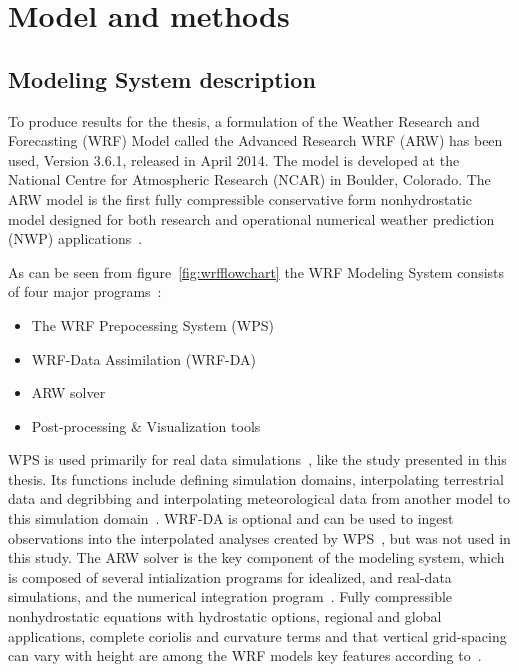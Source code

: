 \chapter{Model and methods}
\label{chap:modmet}
\section{Modeling System description}
\label{sec:modeldes}

To produce results for the thesis, a formulation of the Weather Research and Forecasting (WRF) Model called the Advanced Research WRF (ARW) has been used, Version 3.6.1, released in April 2014. The model is developed at the National Centre for Atmospheric Research (NCAR) in Boulder, Colorado. The ARW model is the first fully compressible conservative form nonhydrostatic model designed for both research and operational numerical weather prediction (NWP) applications~\citep{Skamarock2008}. 

As can be seen from figure~\ref{fig:wrfflowchart} the WRF Modeling System consists of four major programs~\citep{Wang2015}:
\begin{itemize}
\item The WRF Prepocessing System (WPS)
\item WRF-Data Assimilation (WRF-DA)
\item ARW solver
\item Post-processing \& Visualization tools
\end{itemize}

WPS is used primarily for real data simulations~\citep{Wang2015}, like the study presented in this thesis. Its functions include defining simulation domains, interpolating terrestrial data and degribbing and interpolating meteorological data from another model to this simulation domain~\citep{Wang2015}. WRF-DA is optional and can be used to ingest observations into the interpolated analyses created by WPS~\citep{Wang2015}, but was not used in this study. The ARW solver is the key component of the modeling system, which is composed of several intialization programs for idealized, and real-data simulations, and the numerical integration program~\citep{Wang2015}. Fully compressible nonhydrostatic equations with hydrostatic options, regional and global applications, complete coriolis and curvature terms and that vertical grid-spacing can vary with height are among the WRF models key features according to~\cite{Wang2015}.

